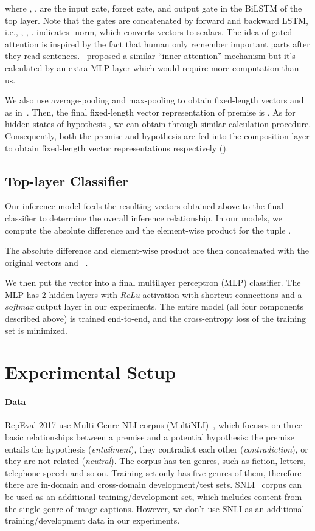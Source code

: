\documentclass[11pt,letterpaper]{article}
\begin{document}
\noindent where , ,  are the input gate, forget gate, and output gate in the BiLSTM of the top layer. Note that the gates are concatenated by forward and backward LSTM, i.e., , , .  indicates -norm, which converts vectors to scalars. The idea of gated-attention is inspired by the fact that human only remember important parts after they read sentences.~\citep{DBLP:journals/corr/LiuSLW16,DBLP:journals/corr/LinFSYXZB17} proposed a similar ``inner-attention'' mechanism but it's calculated by an extra MLP layer which would require more computation than us.

We also use average-pooling and max-pooling to obtain fixed-length vectors  and  as in~\citet{DBLP:journals/corr/ChenZLWJ16}. Then, the final fixed-length vector representation of premise is . As for hidden states of hypothesis , we can obtain  through similar calculation procedure. Consequently, both the premise and hypothesis are fed into the composition layer to obtain fixed-length vector representations respectively ().

\subsection{Top-layer Classifier}
Our inference model feeds the resulting vectors obtained above to the final classifier to determine the overall inference relationship. In our models, we compute the absolute difference and the element-wise product for the tuple . 

The absolute difference and element-wise product are then concatenated with the original vectors  and ~\citep{Mou:P16-2022}. 


We then put the vector  into a final multilayer perceptron (MLP) classifier. The MLP has 2 hidden layers with \textit{ReLu} activation with shortcut connections and a \textit{softmax} output layer in our experiments. The entire model (all four components described above) is trained end-to-end, and the cross-entropy loss of the training set is minimized. 

\section{Experimental Setup}

\paragraph{Data}
RepEval 2017 use Multi-Genre NLI corpus (MultiNLI)~\citep{DBLP:journals/corr/WilliamsNB17}, which focuses on three basic relationships between a premise and a potential hypothesis: the premise entails the hypothesis (\textit{entailment}), they contradict each other (\textit{contradiction}), or they are not related (\textit{neutral}). The corpus has ten genres, such as fiction, letters, telephone speech and so on. Training set only has five genres of them, therefore there are in-domain and cross-domain development/test sets. SNLI~\citep{Bowman:D15-1075} corpus can be used as an additional training/development set, which includes content from the single genre of image captions. However, we don't use SNLI as an additional training/development data in our experiments.
\end{document}
